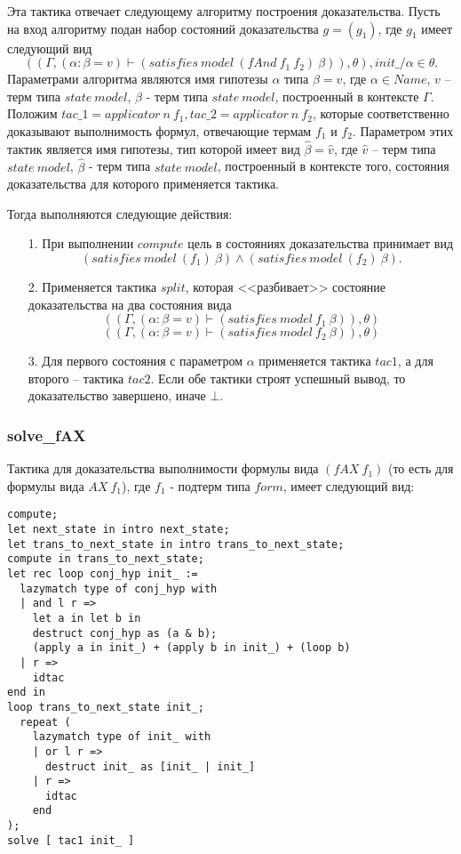 \documentclass[12pt]{article}
\begin{document}
Эта тактика отвечает следующему алгоритму построения доказательства.
Пусть на вход алгоритму подан набор состояний доказательства $g = (g_1)$, где $g_1$ имеет следующий вид 
$$((\Gamma, (\alpha: \beta = v) \vdash (satisfies\ model\ (fAnd\ f_1\ f_2)\ \beta)), \theta), init\_/\alpha \in \theta.$$ Параметрами алгоритма являются имя гипотезы $\alpha$ типа $\beta = v$, где $\alpha \in Name$, $v$ -- терм типа $state\ model$, $\beta$ - терм типа $state\ model$, построенный в контексте $\Gamma$. Положим $tac\_1 = applicator\ n \ f_1, tac\_2 = applicator\ n \ f_2$, которые соответственно доказывают выполнимость формул, отвечающие термам $f_1$ и $f_2$. Параметром этих тактик является имя гипотезы, тип которой имеет вид   $\hat{\beta} = \hat{v}$, где $\hat{v}$ -- терм типа $state\ model$, $\hat{\beta}$ - терм типа $state\ model$, построенный в контексте того, состояния доказательства для которого применяется тактика.

Тогда выполняются следующие действия:
\begin{enumerate}
    \item[1.] При выполнении $compute$ цель в состояниях доказательства принимает вид
    $$(satisfies\ model\ (f_1)\ \beta) \wedge (satisfies\ model\ (f_2)\ \beta).$$
    \item[2.] Применяется тактика $split$, которая <<разбивает>> состояние доказательства на два состояния вида
    $$((\Gamma, (\alpha: \beta = v) \vdash (satisfies\ model\ f_1\ \beta)), \theta)$$
    $$((\Gamma, (\alpha: \beta = v) \vdash (satisfies\ model\ f_2\ \beta)), \theta)$$
    \item[3.] Для первого состояния с параметром $\alpha$ применяется тактика $tac1$, а для второго -- тактика $tac2$. Если обе тактики строят успешный вывод, то доказательство завершено, иначе $\bot$.
\end{enumerate}

\subsubsection{solve\_fAX}

Тактика для доказательства выполнимости формулы вида $(fAX\ f_1)$ (то есть для формулы вида $AX\ f_1$), где $f_1$ - подтерм типа $form$, имеет следующий вид:
\begin{verbatim}
compute;
let next_state in intro next_state;
let trans_to_next_state in intro trans_to_next_state;
compute in trans_to_next_state;
let rec loop conj_hyp init_ :=
  lazymatch type of conj_hyp with
  | and l r => 
    let a in let b in
    destruct conj_hyp as (a & b);
    (apply a in init_) + (apply b in init_) + (loop b)
  | r => 
    idtac
end in
loop trans_to_next_state init_;
  repeat (
    lazymatch type of init_ with
    | or l r =>
      destruct init_ as [init_ | init_]
    | r => 
      idtac
    end
);
solve [ tac1 init_ ]
\end{verbatim}
\end{document}
